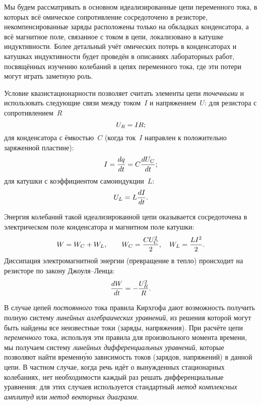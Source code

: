 Мы будем рассматривать в основном идеализированные цепи переменного тока,
в которых всё омическое сопротивление сосредоточено в резисторе,
некомпенсированные заряды расположены только на обкладках конденсатора, а всё
магнитное поле, связанное с током в цепи, локализовано в катушке индуктивности.
Более детальный учёт омических потерь в конденсаторах и катушках индуктивности
будет проведён в описаниях лабораторных работ, посвящённых изучению колебаний в
цепях переменного тока, где эти потери могут играть заметную роль.

Условие квазистационарности позволяет считать элементы цепи
\emph{точечными} и использовать следующие связи между током~$I$ и
напряжением~$U$:
для резистора с сопротивлением~$R$
\begin{equation}
	\eqmark{2.1}
	U_R=IR;
\end{equation}
для конденсатора с ёмкостью~$C$ (когда ток~$I$ направлен к положительно
заряженной пластине):
\begin{equation}
	\eqmark{2.2}
	I=\dfrac{dq}{dt}=C\dfrac{dU_C}{dt};
\end{equation}
для катушки с коэффициентом самоиндукции~$L$:
\begin{equation}
	\eqmark{2.3}
	U_L=L\dfrac{dI}{dt}.
\end{equation}

Энергия колебаний такой идеализированной цепи оказывается сосредоточена 
в электрическом поле конденсатора и магнитном поле катушки:
\begin{equation}
\eqmark{W}
W = W_C + W_L,\qquad W_C = \frac{CU_C^2}{2},\quad W_L=\frac{LI^2}{2}.
\end{equation}
Диссипация электромагнитной энергии (превращение в тепло) происходит 
на резисторе по закону Джоуля--Ленца:
\begin{equation}
\eqmark{JL}
    \frac{dW}{dt} = -\frac{U_R^2}{R}.
\end{equation}

В случае цепей \emph{постоянного} тока правила Кирхгофа дают возможность получить
полную систему \emph{линейных алгебраических уравнений}, из решения которой могут быть
найдены все неизвестные токи (заряды, напряжения). При расчёте цепи 
\emph{переменного}
тока, используя эти правила для произвольного момента времени, мы получаем
систему \emph{линейных дифференциальных уравнений}, которые позволяют найти 
временн\'{у}ю
зависимость токов (зарядов, напряжений) в данной цепи. В частном случае, когда
речь идёт о вынужденных стационарных колебаниях, нет необходимости каждый раз
решать дифференциальные уравнения: для этих случаев используется стандартный
\emph{метод комплексных амплитуд} или \emph{метод векторных диаграмм}.

